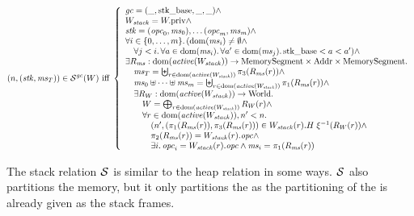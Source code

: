 \begin{jversion}
\begin{definition}
  \label{def:stack-rel}
\[
  \memSatStack{\stk,\ms_T}{W} \text{ iff } 
  \left\{
    \begin{array}{l}
      \gc = (\_,\stkb,\_,\_) \wedge \\
      W_\var{stack} = \pwpriv \wedge \\
      \stk = (\opc_0,\ms_0), \dots (\opc_m,\ms_m) \wedge \\
      \forall i \in \{0,\dots,m\} \ldotp (\dom(\ms_i) \neq \emptyset \wedge\\
      \quad \forall j < i \ldotp \forall a \in \dom(\ms_i) \ldotp \forall a' \in \dom(\ms_j) \ldotp \stkb < a < a') \wedge\\
      \exists R_\ms : \dom(\activeReg{W_\var{stack}}) \fun \MemSeg \times \Addr \times \MemSeg \ldotp \\
      \quad \ms_T = \biguplus_{r \in \dom(\activeReg{W_\var{stack}})} \pi_3(R_\ms(r)) \wedge \\
      \quad \ms_0 \uplus \dots \uplus \ms_m = \biguplus_{r \in \dom(\activeReg{W_\var{stack}})} \pi_1(R_\ms(r)) \wedge \\
      \quad \exists R_W : \dom(\activeReg{W_\var{stack}}) \fun \World \ldotp \\
      \qquad W = \bigoplus_{r \in \dom(\activeReg{W_\var{stack}})} R_W(r) \wedge \\
      \qquad \forall r \in \dom(\activeReg{W_\var{stack}}), n' < n\ldotp \\
      \qquad \quad \npair[n']{(\pi_1(R_\ms(r)),\pi_3(R_\ms(r))} \in W_\var{stack}(r).H \; \xi^{-1}(R_W(r)) \wedge\\
      \qquad \quad \pi_2(R_\ms(r)) = W_\var{stack}(r).\opc \wedge\\
      \qquad \quad \exists i \ldotp \opc_i = W_\var{stack}(r).\opc \wedge \ms_i = \pi_1 (R_\ms(r))
    \end{array}
  \right.
\]
\end{definition}
The stack relation $\lrstk[]$ is similar to the heap relation in some ways.
$\lrstk[]$ also partitions the memory, but it only partitions the \trgcm{} as the partitioning of the \srccm{} is already given as the stack frames.




\end{jversion}

